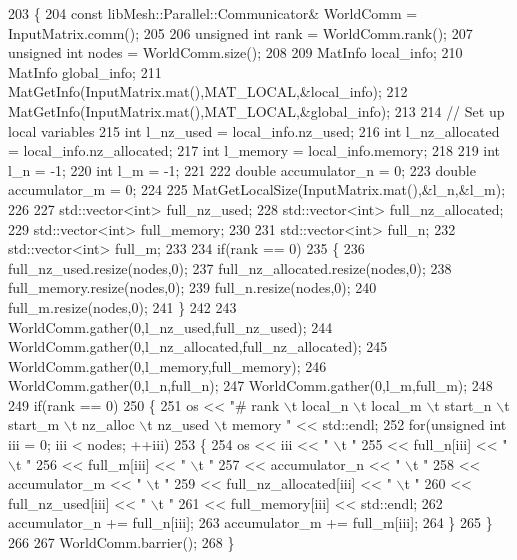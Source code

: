 \begin{DoxyCode}
203 \{
204     \textcolor{keyword}{const} libMesh::Parallel::Communicator& WorldComm = InputMatrix.comm();
205 
206     \textcolor{keywordtype}{unsigned} \textcolor{keywordtype}{int} rank = WorldComm.rank();
207     \textcolor{keywordtype}{unsigned} \textcolor{keywordtype}{int} nodes = WorldComm.size();
208 
209     MatInfo local\_info;
210     MatInfo global\_info;
211     MatGetInfo(InputMatrix.mat(),MAT\_LOCAL,&local\_info);
212     MatGetInfo(InputMatrix.mat(),MAT\_LOCAL,&global\_info);
213 
214     \textcolor{comment}{// Set up local variables}
215     \textcolor{keywordtype}{int} l\_nz\_used = local\_info.nz\_used;
216     \textcolor{keywordtype}{int} l\_nz\_allocated = local\_info.nz\_allocated;
217     \textcolor{keywordtype}{int} l\_memory = local\_info.memory;
218 
219     \textcolor{keywordtype}{int} l\_n = -1;
220     \textcolor{keywordtype}{int} l\_m = -1;
221 
222     \textcolor{keywordtype}{double} accumulator\_n = 0;
223     \textcolor{keywordtype}{double} accumulator\_m = 0;
224 
225     MatGetLocalSize(InputMatrix.mat(),&l\_n,&l\_m);
226 
227     std::vector<int>    full\_nz\_used;
228     std::vector<int>    full\_nz\_allocated;
229     std::vector<int>    full\_memory;
230 
231     std::vector<int>    full\_n;
232     std::vector<int>    full\_m;
233 
234     \textcolor{keywordflow}{if}(rank == 0)
235     \{
236         full\_nz\_used.resize(nodes,0);
237         full\_nz\_allocated.resize(nodes,0);
238         full\_memory.resize(nodes,0);
239         full\_n.resize(nodes,0);
240         full\_m.resize(nodes,0);
241     \}
242 
243     WorldComm.gather(0,l\_nz\_used,full\_nz\_used);
244     WorldComm.gather(0,l\_nz\_allocated,full\_nz\_allocated);
245     WorldComm.gather(0,l\_memory,full\_memory);
246     WorldComm.gather(0,l\_n,full\_n);
247     WorldComm.gather(0,l\_m,full\_m);
248 
249     \textcolor{keywordflow}{if}(rank == 0)
250     \{
251         os << \textcolor{stringliteral}{"# rank \(\backslash\)t local\_n \(\backslash\)t local\_m \(\backslash\)t start\_n \(\backslash\)t start\_m \(\backslash\)t nz\_alloc \(\backslash\)t nz\_used \(\backslash\)t memory  "} << 
      std::endl;
252         \textcolor{keywordflow}{for}(\textcolor{keywordtype}{unsigned} \textcolor{keywordtype}{int} iii = 0; iii < nodes; ++iii)
253         \{
254             os  << iii << \textcolor{stringliteral}{" \(\backslash\)t "}
255                 << full\_n[iii] << \textcolor{stringliteral}{" \(\backslash\)t "}
256                 << full\_m[iii] << \textcolor{stringliteral}{" \(\backslash\)t "}
257                 << accumulator\_n << \textcolor{stringliteral}{" \(\backslash\)t "}
258                 << accumulator\_m << \textcolor{stringliteral}{" \(\backslash\)t "}
259                 << full\_nz\_allocated[iii] << \textcolor{stringliteral}{" \(\backslash\)t "}
260                 << full\_nz\_used[iii] << \textcolor{stringliteral}{" \(\backslash\)t "}
261                 << full\_memory[iii] << std::endl;
262             accumulator\_n += full\_n[iii];
263             accumulator\_m += full\_m[iii];
264         \}
265     \}
266 
267     WorldComm.barrier();
268 \}
\end{DoxyCode}
